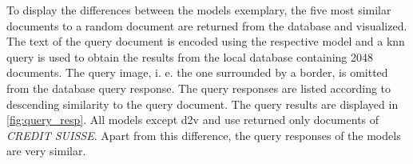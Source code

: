 To display the differences between the models exemplary, the five most similar documents to a random document are returned from the database and visualized.
The text of the query document is encoded using the respective model and a 
\ac{knn} query is used to obtain the results from the local database containing 2048 documents.
The query image, i. e. the one surrounded by a border, is omitted from the database query response.
The query responses are listed according to descending similarity to the query document.
The query results are displayed in \autoref{fig:query_resp}.
All models except \ac{d2v} and \ac{use} returned only documents of \textit{CREDIT SUISSE}.
Apart from this difference, the query responses of the models are very similar.


